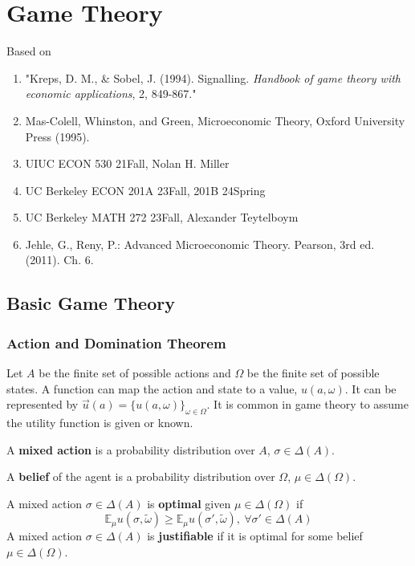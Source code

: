 \documentclass[11pt]{elegantbook}
\begin{document}
\chapter{Game Theory}
Based on
\begin{enumerate}[$\circ$]
    \item "Kreps, D. M., \& Sobel, J. (1994). Signalling. \textit{Handbook of game theory with economic applications}, 2, 849-867."
    \item Mas-Colell, Whinston, and Green, Microeconomic Theory, Oxford University Press (1995).
    \item UIUC ECON 530 21Fall, Nolan H. Miller
    \item UC Berkeley ECON 201A 23Fall, 201B 24Spring
    \item UC Berkeley MATH 272 23Fall, Alexander Teytelboym
    \item  Jehle, G., Reny, P.: Advanced Microeconomic Theory. Pearson, 3rd ed. (2011). Ch. 6.
\end{enumerate}



\section{Basic Game Theory}
\subsection{Action and Domination Theorem}
Let $A$ be the finite set of possible actions and $\Omega$ be the finite set of possible states. A function can map the action and state to a value, $u(a,\omega)$. It can be represented by $\vec{u}(a)=\{u(a,\omega)\}_{\omega\in\Omega}$. It is common in game theory to assume the utility function is given or known.

A \textbf{mixed action} is a probability distribution over $A$, $\sigma\in\Delta(A)$.

A \textbf{belief} of the agent is a probability distribution over $\Omega$, $\mu\in\Delta(\Omega)$.

\begin{definition}
    \normalfont
    A mixed action $\sigma\in\Delta(A)$ is \textbf{optimal} given $\mu\in\Delta(\Omega)$ if $$\mathbb{E}_\mu u(\sigma,\tilde{\omega})\geq \mathbb{E}_\mu u(\sigma',\tilde{\omega}),\ \forall \sigma'\in \Delta(A)$$
    A mixed action $\sigma\in\Delta(A)$ is \textbf{justifiable} if it is optimal for some belief $\mu\in\Delta(\Omega)$.
\end{definition}
\end{document}
